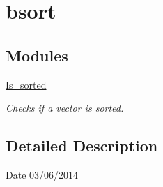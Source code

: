 \hypertarget{group__bsort}{\section{bsort}
\label{group__bsort}
}
\subsection*{Modules}
\begin{DoxyCompactItemize}
\item 
\hyperlink{group__is__sorted}{Is\-\_\-sorted}
\begin{DoxyCompactList}\small\item\em Checks if a vector is sorted. \end{DoxyCompactList}\end{DoxyCompactItemize}


\subsection{Detailed Description}
\begin{DoxyDate}{Date}
03/06/2014 
\end{DoxyDate}
